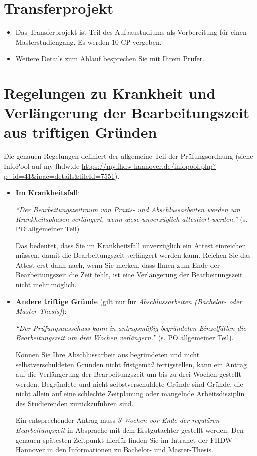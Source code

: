 \section{Transferprojekt}

\begin{itemize}
    \item Das Transferprojekt ist Teil des Aufbaustudiums als Vorbereitung für einen Masterstudiengang. Es werden 10 CP vergeben.
    \item Weitere Details zum Ablauf besprechen Sie mit Ihrem Prüfer.
\end{itemize}


\section{Regelungen zu Krankheit und Verlängerung der Bearbeitungszeit aus triftigen Gründen}

Die genauen Regelungen definiert der allgemeine Teil der Prüfungsordnung (siehe InfoPool auf my-fhdw.de \url{https://my.fhdw-hannover.de/infopool.php?p_id=41&ipac=details&fileId=7551}).

\begin{itemize}
    \item \textbf{Im Krankheitsfall}:
    
    \textit{\enquote{Der Bearbeitungszeitraum von Praxis- und Abschlussarbeiten werden um Krankheitsphasen verlängert, wenn diese unverzüglich attestiert werden.}} (s. PO allgemeiner Teil) 
    
    Das bedeutet, dass Sie im Krankheitsfall unverzüglich ein Attest einreichen müssen, damit die Bearbeitungszeit verlängert werden kann. Reichen Sie das Attest erst dann nach, wenn Sie merken, dass Ihnen zum Ende der Bearbeitungszeit die Zeit fehlt, ist eine Verlängerung der Bearbeitungszeit nicht mehr möglich.
    
    \item \textbf{Andere triftige Gründe} 
    (gilt nur für \textit{Abschlussarbeiten (Bachelor- oder Master-Thesis)}): 
    
    \textit{\enquote{Der Prüfungsausschuss kann in antragsmäßig begründeten Einzelfällen die Bearbeitungszeit um drei Wochen verlängern.}} (s. PO allgemeiner Teil).

    Können Sie Ihre Abschlussarbeit aus begründeten und nicht selbstverschuldeten Gründen nicht fristgemäß fertigstellen, kann ein Antrag auf die Verlängerung der Bearbeitungszeit um bis zu drei Wochen gestellt werden.
    Begründete und nicht selbstverschuldete Gründe sind Gründe, die nicht allein auf eine schlechte Zeitplanung oder mangelnde Arbeitsdisziplin des Studierenden zurückzuführen sind.

    Ein entsprechender Antrag muss \textit{3 Wochen vor Ende der regulären Bearbeitungszeit} in Absprache mit dem Erstgutachter gestellt werden. Den genauen spätesten Zeitpunkt hierfür finden Sie im Intranet der FHDW Hannover in den Informationen zu Bachelor- und Master-Thesis.
\end{itemize}

